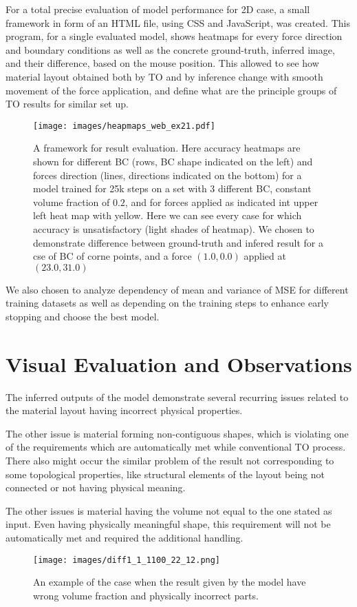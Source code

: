 For a total precise evaluation of model performance for 2D case, a small framework in form of an HTML file, using CSS and JavaScript, was created.
This program, for a single evaluated model, shows heatmaps for every force direction and boundary conditions as well as the concrete ground-truth, inferred image, and their difference, based on the mouse position.
This allowed to see how material layout obtained both by TO and by inference change with smooth movement of the force application, and define what are the principle groups of TO results for similar set up.
\begin{figure}[H]
	\centering
	\texttt{[image: images/heapmaps\_web\_ex21.pdf]}
	\caption{A framework for result evaluation. Here accuracy heatmaps are shown for different BC (rows, BC shape indicated on the left) and forces direction (lines, directions indicated on the bottom) for a model trained for 25k steps on a set with 3 different BC, constant volume fraction of $0.2$, and for forces applied as indicated int upper left heat map with yellow. Here we can see every case for which accuracy is unsatisfactory (light shades of heatmap). We chosen to demonstrate difference between ground-truth and infered result for a cse of BC of corne points, and a force $(1.0,0.0)$ applied at $(23.0,31.0)$ }
	\label{fig:to_flow}
\end{figure}
\medskip

We also chosen to analyze dependency of mean and variance of MSE for different training datasets as well as depending on the training steps to enhance early stopping and choose the best model.
\medskip

\section{Visual Evaluation and Observations}

The inferred outputs of the model demonstrate several recurring issues related to the material layout having incorrect physical properties.
\medskip

The other issue is material forming non-contiguous shapes, which is violating one of the requirements which are automatically met while conventional TO process.
There also might occur the similar problem of the result not corresponding to some topological properties, like structural elements of the layout being not connected or not having physical meaning. 
\medskip

The other issues is material having the volume not equal to the one stated as input.
Even having physically meaningful shape, this requirement will not be automatically met and required the additional handling.
\begin{figure}[h]
	\centering
	\texttt{[image: images/diff1\_1\_1100\_22\_12.png]}
	\label{fig:element_cloudy_example}
	\caption{An example of the case when the result given by the model have wrong volume fraction and physically incorrect parts.}
\end{figure}
\medskip

